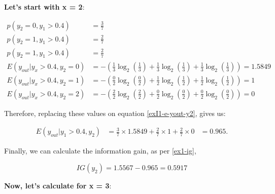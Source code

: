 \documentclass[12pt]{article}
\begin{document}
\begin{enumerate}[leftmargin=\labelsep]
    \textbf{Let's start with x = 2}:

    \[
        \begin{aligned}
            p(y_2 = 0, y_1 > 0.4)          & = \frac{3}{7}                                                                                               \\
            p(y_2 = 1, y_1 > 0.4)          & = \frac{2}{7}                                                                                              \\
            p(y_2 = 1, y_1 > 0.4)          & = \frac{2}{7}                                                                                              \\
            E(y_{out} | y_x > 0.4 , y_2 = 0) & = - \left(\frac{1}{3} \log_2\left(\frac{1}{3}\right) + \frac{1}{3} \log_2\left(\frac{1}{3}\right)
                + \frac{1}{3} \log_2\left(\frac{1}{3}\right)\right) = 1.5849                                                                   \\
            E(y_{out} | y_x > 0.4 , y_2 = 1) & = - \left(\frac{0}{2} \log_2\left(\frac{0}{2}\right) + \frac{1}{2} \log_2\left(\frac{1}{2}\right)
                + \frac{1}{2} \log_2\left(\frac{1}{2}\right)\right) = 1                                                                        \\
            E(y_{out} | y_x > 0.4 , y_2 = 2) & = - \left(\frac{2}{2} \log_2\left(\frac{2}{2}\right) + \frac{0}{2} \log_2\left(\frac{0}{2}\right)
                + \frac{0}{2} \log_2\left(\frac{0}{2}\right)\right) = 0
        \end{aligned}
    \]

    Therefore, replacing these values on equation \eqref{exI1-e-yout-y2}, gives us:

    \[
        \begin{aligned}
            E(y_{out} | y_1>0.4, y_2) & = \frac{3}{7} \times 1.5849 + \frac{2}{7} \times 1 +  \frac{2}{7} \times 0 & = 0.965.
        \end{aligned}
    \]

    Finally, we can calculate the information gain, as per \eqref{ex1-ig},

    \[
        IG(y_{2}) = 1.5567 - 0.965 = 0.5917
    \]

    \textbf{Now, let's calculate for x = 3}:


\end{enumerate}
\end{document}
